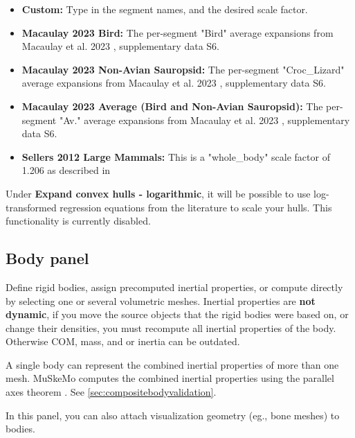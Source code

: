 \documentclass{article}
\begin{document}
\begin{itemize}
    \item \textbf{Custom:} Type in the segment names, and the desired scale factor.
    \item \textbf{Macaulay 2023 Bird:} The per-segment "Bird" average expansions from Macaulay et al. 2023 \cite{macaulayDecouplingBodyShape2023}, supplementary data S6.
    \item \textbf{Macaulay 2023 Non-Avian Sauropsid:} The per-segment "Croc\_Lizard" average expansions from Macaulay et al. 2023 \cite{macaulayDecouplingBodyShape2023}, supplementary data S6.
    \item \textbf{Macaulay 2023 Average (Bird and Non-Avian Sauropsid):} The per-segment "Av." average expansions from Macaulay et al. 2023 \cite{macaulayDecouplingBodyShape2023}, supplementary data S6.
    \item \textbf{Sellers 2012 Large Mammals:} This is a "whole\_body" scale factor of 1.206 as described in \cite{sellersMinimumConvexHull2012a}
\end{itemize}

Under \textbf{Expand convex hulls - logarithmic}, it will be possible to use log-transformed regression equations from the literature to scale your hulls. This functionality is currently disabled.


\subsection{Body panel}
\label{sec:bodypanel}

Define rigid bodies, assign precomputed inertial properties, or compute directly by selecting one or several volumetric meshes.
Inertial properties are \textbf{not dynamic}, if you move the source objects that the rigid bodies were based on, or change their densities, you must recompute all inertial properties of the body. Otherwise COM, mass, and or inertia can be outdated.

A single body can represent the combined inertial properties of more than one mesh. MuSkeMo computes the combined inertial properties using the parallel axes theorem \cite{valleryAdvancedDynamics2019,ruinaMechanicsToolsetStatics2019}. See \ref{sec:compositebodyvalidation}.

In this panel, you can also attach visualization geometry (eg., bone meshes) to bodies. 
\end{document}
